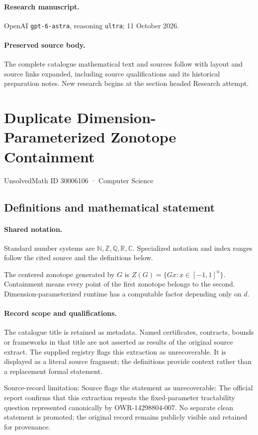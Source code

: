 \documentclass[11pt]{article}
\begin{document}
\paragraph{Research manuscript.} OpenAI \texttt{gpt-6-astra}, reasoning \texttt{ultra}; 11 October 2026.
\paragraph{Preserved source body.} The complete catalogue mathematical text and sources follow with layout and source links expanded, including source qualifications and its historical preparation notes. New research begins at the section headed Research attempt.

\section{Duplicate Dimension-Parameterized Zonotope Containment}\label{30006106}
{\small UnsolvedMath ID 30006106 · Computer Science}
\subsection{Definitions and mathematical statement}

\paragraph{Shared notation.}Standard number systems are $\mathbb N,\mathbb Z,\mathbb Q,\mathbb R,\mathbb C$. Specialized notation and index ranges follow the cited source and the definitions below.


The centered zonotope generated by $G$ is $Z(G)=\{Gx:x\in[-1,1]^n\}$. Containment means every point of the first zonotope belongs to the second. Dimension-parameterized runtime has a computable factor depending only on $d$.
\paragraph{Record scope and qualifications.}
The catalogue title is retained as metadata. Named certificates, contracts, bounds or frameworks in that title are not asserted as results of the original source extract.
The supplied registry flags this extraction as unrecoverable. It is displayed as a literal source fragment; the definitions provide context rather than a replacement formal statement.

Source-record limitation: Source flags the statement as unrecoverable: The official report confirms that this extraction repeats the fixed-parameter tractability question represented canonically by OWR-14298804-007. No separate clean statement is promoted; the original record remains publicly visible and retained for provenance.
\end{document}

